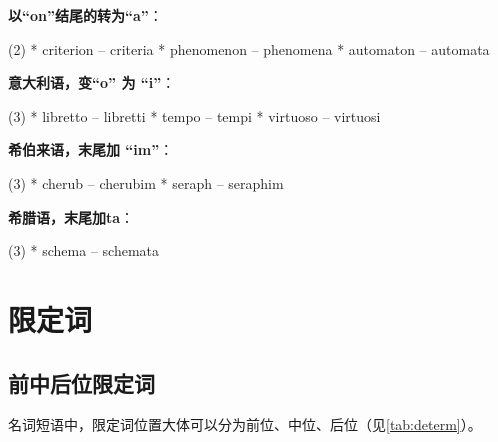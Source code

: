 \begin{description}
  \textbf{以``on''结尾的转为``a''}：
  \begin{taskitem}(2)
    *  criterion -- criteria
    *  phenomenon -- phenomena
    *  automaton -- automata
  \end{taskitem}


  \textbf{意大利语，变``o'' 为 ``i''}：
  \begin{taskitem}(3)
    *  libretto -- libretti
    *  tempo -- tempi
    *  virtuoso -- virtuosi
  \end{taskitem}

  \textbf{希伯来语，末尾加 ``im''}：
  \begin{taskitem}(3)
    *  cherub -- cherubim
    *  seraph -- seraphim
  \end{taskitem}

  \textbf{希腊语，末尾加ta}：
  \begin{taskitem}(3)
    *  schema -- schemata
  \end{taskitem}
\end{description}

\section{限定词}
\label{sec:determin}

\subsection{前中后位限定词}

名词短语中，限定词位置大体可以分为前位、中位、后位（见\cref{tab:determ}）。

